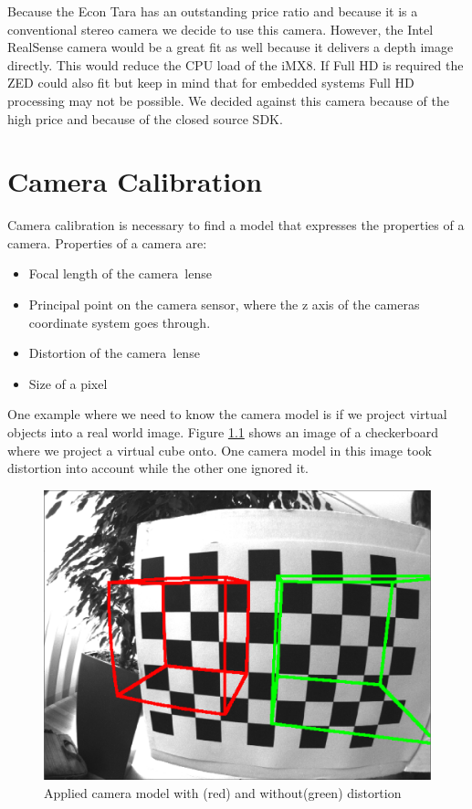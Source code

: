 \documentclass[11pt,a4paper,titlepage,oneside]{report}
\begin{document}
Because the Econ Tara has an outstanding price ratio and because it is a conventional stereo camera we decide to use this camera. However, the Intel RealSense camera would be a great fit as well because it delivers a depth image directly. This would reduce the CPU load of the iMX8. If Full HD is required the ZED could also fit but keep in mind that for embedded systems Full HD processing may not be possible. We decided against this camera because of the high price and because of the closed source SDK.

\chapter{Camera Calibration}

Camera calibration is necessary to find a model that expresses the properties of a camera. Properties of a camera are:

\begin{itemize}
	\item Focal length of the camera lense
	\item Principal point on the camera sensor, where the z axis of the cameras coordinate system goes through.
	\item Distortion of the camera lense
	\item Size of a pixel
\end{itemize}

One example where we need to know the camera model is if we project virtual objects into a real world image. Figure \ref{fig:model} shows an image of a checkerboard where we project a virtual cube onto. One camera model in this image took distortion into account while the other one ignored it.
\begin{figure}[H]
  \begin{center}
		\includegraphics[width=1.0\textwidth]{img/model.png}
  \end{center}
	\caption{Applied camera model with (red) and without(green) distortion}\label{fig:model}
\end{figure}
\end{document}
